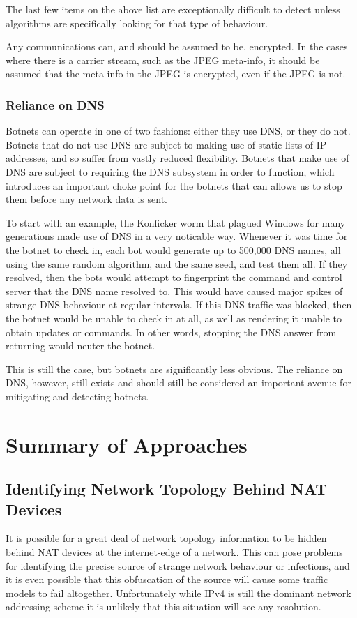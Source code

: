 \documentclass{article}
\theoremstyle{remark}
\theoremstyle{definition}
\theoremstyle{definition}
\theoremstyle{definition}
\begin{document}
The last few items on the above list are exceptionally difficult to detect unless algorithms are specifically looking for that type of behaviour.

Any communications can, and should be assumed to be, encrypted. In the cases where there is a carrier stream, such as the JPEG meta-info, it should be assumed that the meta-info in the JPEG is encrypted, even if the JPEG is not.

\subsubsection{Reliance on DNS}
Botnets can operate in one of two fashions: either they use DNS, or they do not. Botnets that do not use DNS are subject to making use of static lists of IP addresses, and so suffer from vastly reduced flexibility. Botnets that make use of DNS are subject to requiring the DNS subsystem in order to function, which introduces an important choke point for the botnets that can allows us to stop them before any network data is sent.

To start with an example, the Konficker worm that plagued Windows for many generations made use of DNS in a very noticable way. Whenever it was time for the botnet to check in, each bot would generate up to 500,000 DNS names, all using the same random algorithm, and the same seed, and test them all. If they resolved, then the bots would attempt to fingerprint the command and control server that the DNS name resolved to. This would have caused major spikes of strange DNS behaviour at regular intervals. If this DNS traffic was blocked, then the botnet would be unable to check in at all, as well as rendering it unable to obtain updates or commands. In other words, stopping the DNS answer from returning would neuter the botnet.

This is still the case, but botnets are significantly less obvious. The reliance on DNS, however, still exists and should still be considered an important avenue for mitigating and detecting botnets.

\section{Summary of Approaches}

\subsection{Identifying Network Topology Behind NAT Devices}
It is possible for a great deal of network topology information to be hidden behind NAT devices at the internet-edge of a network. This can pose problems for identifying the precise source of strange network behaviour or infections, and it is even possible that this obfuscation of the source will cause some traffic models to fail altogether. Unfortunately while IPv4 is still the dominant network addressing scheme it is unlikely that this situation will see any resolution.
\end{document}
